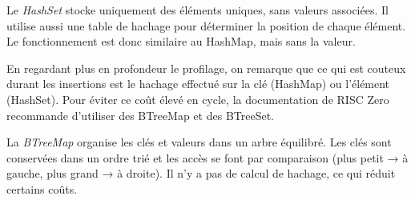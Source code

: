 \documentclass[12pt]{report}
\begin{document}
\vspace{0.3cm}

Le \textit{HashSet} stocke uniquement des éléments uniques, 
sans valeurs associées. Il utilise aussi une table de hachage 
pour déterminer la position de chaque élément. Le fonctionnement 
est donc similaire au HashMap, mais sans la valeur.

\vspace{0.3cm}
\begin{center}
\end{center}

\vspace{0.3cm}

En regardant plus en profondeur le profilage, on remarque que ce qui
est couteux durant les insertions est le hachage effectué sur la clé (HashMap)
ou l'élément (HashSet). Pour éviter ce coût élevé en cycle, la documentation
de RISC Zero recommande d'utiliser des BTreeMap et des BTreeSet.

\medskip

La \textit{BTreeMap} organise les clés et valeurs dans un arbre 
équilibré. Les clés sont conservées dans un ordre trié et les 
accès se font par comparaison (plus petit → à gauche, plus grand →
à droite). Il n'y a pas de calcul de hachage, 
ce qui réduit certains coûts.

\vspace{0.3cm}
\begin{center}
\end{center}

\vspace{0.3cm}
\end{document}
